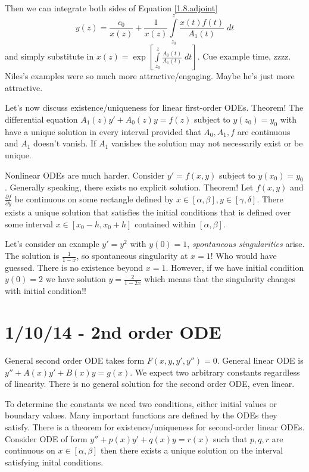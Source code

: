 \documentclass[10pt]{report}
\newcommand{\pd}[2]{\frac{\partial #1}{\partial#2}}
\begin{document}
Then we can integrate both sides of Equation \ref{1.8.adjoint}
\begin{equation}
    y(z) = \frac{c_0}{x(z)} + \frac{1}{x(z)}\displaystyle\int\limits_{z_0}^{z}\frac{x(t)f(t)}{A_1(t)}\;dt 
    \label{1.8.sol}
\end{equation}
and simply substitute in $x(z) = \exp\left[ \displaystyle\int\limits_{z_0}^{z}\frac{A_0(t)}{A_1(t)}\;dt \right]$. Cue example time, zzzz. Niles's examples were so much more attractive/engaging. Maybe he's just more attractive.

Let's now discuss existence/uniqueness for linear first-order ODEs. Theorem! The differential equation $A_1(z) y' + A_0(z)y = f(z)$ subject to $y(z_0) = y_0$ with have a unique solution in every interval provided that $A_0, A_1, f$ are continuous and $A_1$ doesn't vanish. If $A_1$ vanishes the solution may not necessarily exist or be unique.

Nonlinear ODEs are much harder. Consider $y' = f(x,y)$ subject to $y(x_0) = y_0$. Generally speaking, there exists no explicit solution. Theorem! Let $f(x,y)$ and $\pd{f}{y}$ be continuous on some rectangle defined by $x \in [\alpha,\beta], y \in [\gamma,\delta]$. There exists a unique solution that satisfies the initial conditions that is defined over some interval $x \in [x_0 -h, x_0 + h]$ contained within $[\alpha,\beta]$.

Let's consider an example $y' = y^2$ with $y(0) = 1$, \emph{spontaneous singularities} arise. The solution is $\frac{1}{1-x}$, so spontaneous singularity at $x=1$! Who would have guessed. There is no existence beyond $x=1$. However, if we have initial condition $y(0) = 2$ we have solution $y = \frac{2}{1-2x}$ which means that the singularity changes with initial condition!!

\chapter{1/10/14 - 2nd order ODE}

General second order ODE takes form $F(x,y,y',y'') = 0$. General linear ODE is $y'' + A(x) y' + B(x)y = g(x)$. We expect two arbitrary constants regardless of linearity. There is no general solution for the second order ODE, even linear.

To determine the constants we need two conditions, either initial values or boundary values. Many important functions are defined by the ODEs they satisfy. There is a theorem for existence/uniqueness for second-order linear ODEs. Consider ODE of form $y'' + p(x)y' + q(x)y = r(x)$ such that $p,q,r$ are continuous on $x \in [\alpha,\beta]$ then there exists a unique solution on the interval satisfying inital conditions.
\end{document}
